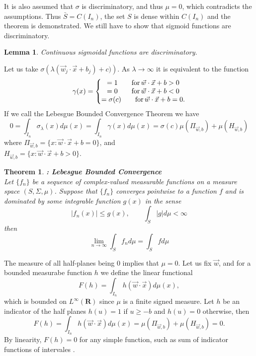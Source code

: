 \documentclass[aps,amssymb,amsmath,amsfonts,pra,superscriptaddress,onecolumn]{revtex4}
\newtheorem{theorem}{Theorem}
\newtheorem{lemma}{Lemma}
\begin{document}
It is also assumed that $\sigma$ is discriminatory, and thus $\mu=0$, which contradicts the assumptions. Thus $\bar S = C(I_n)$, the set $S$ is dense within $C(I_n)$ and the theorem is demonstrated. We still have to show that sigmoid functions are discriminatory.

\begin{lemma}
Continuous sigmoidal functions are discriminatory.
\end{lemma}
Let us take $\sigma\left(\lambda(\vec w_j \cdot \vec x + b_j) + c)\right)$. As $\lambda \rightarrow \infty$ it is equivalent to the function
\begin{equation}
\gamma(x) = \left\lbrace \begin{matrix}
= 1 \qquad {\rm for \,} \vec w \cdot \vec x + b > 0 \\
= 0 \qquad {\rm for \,} \vec w \cdot \vec x + b < 0 \\
= \sigma(c) \qquad {\rm for \,} \vec w \cdot \vec x + b = 0. 
\end{matrix}\right.
\end{equation}
If we call the Lebesgue Bounded Convergence Theorem we have
\begin{equation}
0 = \int_{I_n} \sigma_\lambda(x) d\mu(x) = \int_{I_n} \gamma(x) d\mu(x) = \sigma(c) \mu(\Pi_{\vec w, b}) + \mu(H_{\vec w, b})
\end{equation}
where $\Pi_{\vec w, b} = \lbrace x : \vec w \cdot \vec x + b = 0\rbrace$, and \\$H_{\vec w, b} = \lbrace x : \vec w \cdot \vec x + b > 0\rbrace$. 

\begin{theorem}
{\bf: Lebesgue Bounded Convergence} \cite{analysis-weir1974}\\
Let $\lbrace f_n\rbrace$ be a sequence of complex-valued measurable functions on a measure space $(S, \Sigma, \mu)$. Suppose that $\lbrace f_n \rbrace$ converges pointwise to a function $f$ and is dominated by some integrable function $g(x)$ in the sense
\begin{equation}
|f_n(x)| \leq g(x), \qquad \int_S |g|d\mu < \infty
\end{equation}
then
\begin{equation}
\lim_{n\rightarrow \infty} \int_S f_n d\mu = \int_S f d\mu
\end{equation}
\end{theorem}

The measure of all half-planes being 0 implies that $\mu = 0$. Let us fix $\vec w$, and for a bounded measurabe function $h$ we define the linear functional
\begin{equation}
F(h) = \int_{I_n} h(\vec w \cdot \vec x) d\mu(x),
\end{equation}
which is bounded on $L^\infty(\mathbf{R})$ since $\mu$ is a finite signed measure. Let $h$ be an indicator of the half planes $h(u) = 1$ if $u\geq -b$ and $h(u) = 0$ otherwise, then
\begin{equation}
F(h) = \int_{I_n} h(\vec w \cdot \vec x) d\mu(x) =  \mu(\Pi_{\vec w, b}) + \mu(H_{\vec w, b}) = 0.
\end{equation}
By linearity, $F(h) = 0$ for any simple function, such as sum of indicator functions of intervales \cite{analysis-ash1972}. 
\end{document}
